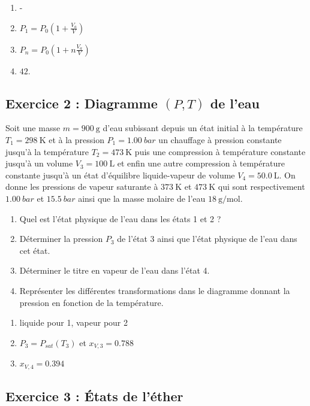 \begin{enumerate}
	\item -
	\item $P_1 = P_0\left( 1 + \frac{V_a}{V} \right)$
	\item $P_n = P_0\left( 1 + n\frac{V_a}{V} \right)$
	\item $42$.
\end{enumerate}

\subsection{Exercice 2 : Diagramme $(P, T)$ de l'eau}

Soit une masse $m = \SI{900}{\gram}$ d'eau subissant depuis un état initial à la température $T_1 = \SI{298}{\kelvin}$ et à la pression $P_1 = \SI{1.00}{bar}$ un chauffage à pression constante jusqu'à la température $T_2 = \SI{473}{\kelvin}$ puis une compression à température constante jusqu'à un volume $V_3 = \SI{100}{\liter}$ et enfin une autre compression à température constante jusqu'à un état d'équilibre liquide-vapeur de volume $V_4 = \SI{50.0}{\liter}$. On donne les pressions de vapeur saturante à $\SI{373}{\kelvin}$ et $\SI{473}{\kelvin}$ qui sont respectivement $\SI{1.00}{bar}$ et $\SI{15.5}{bar}$ ainsi que la masse molaire de l'eau $\SI{18}{\gram\per\mol}$.

\begin{enumerate}
	\item Quel est l'état physique de l'eau dans les états 1 et 2 ?
	\item Déterminer la pression $P_3$ de l'état 3 ainsi que l'état physique de l'eau dans cet état.
	\item Déterminer le titre en vapeur de l'eau dans l'état 4.
	\item Représenter les différentes transformations dans le diagramme donnant la pression en fonction de la température.
\end{enumerate}

\begin{enumerate}
	\item liquide pour 1, vapeur pour 2
	\item $P_3 = P_{sat}(T_3)$ et $x_{V, 3} = 0.788$
	\item $x_{V, 4} = 0.394$
\end{enumerate}

\subsection{Exercice 3 : États de l'éther}

